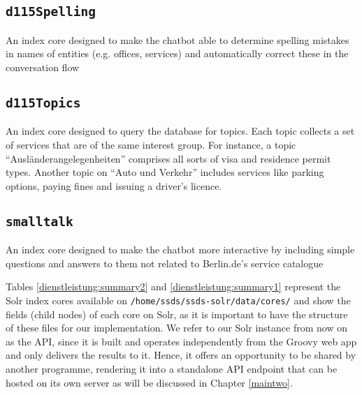 \begin{flushleft}
	
	\subsection*{\texttt{d115Spelling}}
	An index core designed to make the chatbot able to determine spelling mistakes in names of entities (e.g. offices, services) and automatically correct these in the conversation flow
	
	\subsection*{\texttt{d115Topics}}
	An index core designed to query the database for topics. Each topic collects a set of services that are of the same interest group. For instance, a topic ``Ausländerangelegenheiten'' comprises all sorts of visa and residence permit types. Another topic on ``Auto und Verkehr'' includes services like parking options, paying fines and issuing a driver's licence.
	
	\subsection*{\texttt{smalltalk}}
	An index core designed to make the chatbot more interactive by including simple questions and answers to them not related to Berlin.de's service catalogue
	
	
	


\end{flushleft}




Tables \ref{dienstleistung:summary2} and \ref{dienstleistung:summary1} represent the Solr index cores available on \texttt{/home/ssds/ssds-solr/data/cores/} and show the fields (child nodes) of each core on Solr, as it is important to have the structure of these files for our implementation.%
We refer to our Solr instance from now on as the API, since it is built and operates independently from the Groovy web app and only delivers the results to it. Hence, it offers an opportunity to be shared by another programme, rendering it into a standalone API endpoint that can be hosted on its own server as will be discussed in Chapter \ref{maintwo}.

